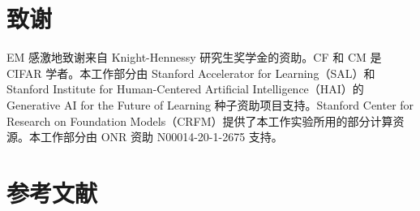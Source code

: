 \documentclass[11pt,UTF8,fontset=fandol]{ctexart}
\begin{document}
\section*{致谢}

EM 感激地致谢来自 Knight-Hennessy 研究生奖学金的资助。CF 和 CM 是 CIFAR 学者。本工作部分由 Stanford Accelerator for Learning（SAL）和 Stanford Institute for Human-Centered Artificial Intelligence（HAI）的 Generative AI for the Future of Learning 种子资助项目支持。Stanford Center for Research on Foundation Models（CRFM）提供了本工作实验所用的部分计算资源。本工作部分由 ONR 资助 N00014-20-1-2675 支持。

\section*{参考文献}
\end{document}
